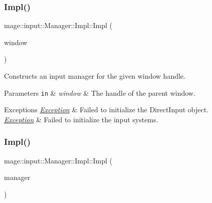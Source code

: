 \subsubsection{\texorpdfstring{Impl()}{Impl()}\hspace{0.1cm}{\footnotesize\ttfamily [1/3]}}
{\footnotesize\ttfamily mage\+::input\+::\+Manager\+::\+Impl\+::\+Impl (\begin{DoxyParamCaption}\item[{\hyperlink{namespacemage_a8769f9d670d6b585ea306cb1062af94b}{Not\+Null}$<$ H\+W\+ND $>$}]{window }\end{DoxyParamCaption})\hspace{0.3cm}{\ttfamily [explicit]}}

Constructs an input manager for the given window handle.


\begin{DoxyParams}[1]{Parameters}
\mbox{\tt in}  & {\em window} & The handle of the parent window. \\
\hline
\end{DoxyParams}

\begin{DoxyExceptions}{Exceptions}
{\em \hyperlink{classmage_1_1_exception}{Exception}} & Failed to initialize the Direct\+Input object. \\
\hline
{\em \hyperlink{classmage_1_1_exception}{Exception}} & Failed to initialize the input systems. \\
\hline
\end{DoxyExceptions}
\hypertarget{classmage_1_1input_1_1_manager_1_1_impl_a9c1f7ee1af99eb2811820d622850dc06}{}\label{classmage_1_1input_1_1_manager_1_1_impl_a9c1f7ee1af99eb2811820d622850dc06} 
\subsubsection{\texorpdfstring{Impl()}{Impl()}\hspace{0.1cm}{\footnotesize\ttfamily [2/3]}}
{\footnotesize\ttfamily mage\+::input\+::\+Manager\+::\+Impl\+::\+Impl (\begin{DoxyParamCaption}\item[{const \hyperlink{classmage_1_1input_1_1_manager_1_1_impl}{Impl} \&}]{manager }\end{DoxyParamCaption})\hspace{0.3cm}{\ttfamily [delete]}}

